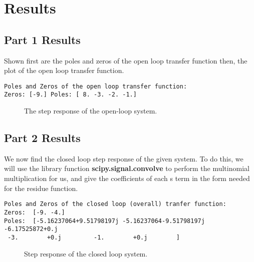 \documentclass[12pt]{report}
\begin{document}
\hypertarget{results}{%
\chapter{Results}\label{results}}

\hypertarget{part-1-results}{%
\section{Part 1 Results}\label{part-1-results}}

Shown first are the poles and zeros of the open loop transfer function
then, the plot of the open loop transfer function.

    \begin{Verbatim}[commandchars=\\\{\}]
Poles and Zeros of the open loop transfer function:
Zeros: [-9.] Poles: [ 8. -3. -2. -1.]

    \end{Verbatim}

    \begin{figure}
    \begin{center}
    \end{center}
    \caption{The step response of the open-loop system.}
\end{figure}
    
\pagebreak

\hypertarget{part-2-results}{%
\section{Part 2 Results}\label{part-2-results}}

We now find the closed loop step response of the given system. To do
this, we will use the library function \textbf{scipy.signal.convolve} to
perform the multinomial multiplication for us, and give the coefficients
of each s term in the form needed for the residue function.

    \begin{Verbatim}[commandchars=\\\{\}]
Poles and Zeros of the closed loop (overall) tranfer function:
Zeros:  [-9. -4.]
Poles:  [-5.16237064+9.51798197j -5.16237064-9.51798197j -6.17525872+0.j
 -3.        +0.j         -1.        +0.j        ]

    \end{Verbatim}

    \begin{figure}
    \begin{center}
    \end{center}
    \caption{Step response of the closed loop system.}
\end{figure}
    
\end{document}
